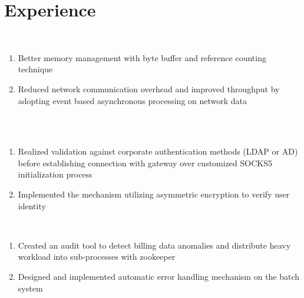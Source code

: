 \documentclass[]{deedy-resume-openfont}
\begin{document}
\section{Experience}
 \\
\begin{enumerate}[label=$\diamond$]
    \item Better memory management with byte buffer and reference counting technique
    \item Reduced network communication overhead and improved throughput by adopting event based asynchronous processing on network data
\end{enumerate}
 \\
\\
\begin{enumerate}[label=$\diamond$]
    \item Realized validation against corporate authentication methods (LDAP or AD) before establishing connection with gateway over customized SOCKS5 initialization process
    \item Implemented the mechanism utilizing asymmetric encryption to verify user identity 
\end{enumerate}
 \\
\begin{enumerate}[label=$\diamond$]
    \item Created an audit tool to detect billing data anomalies and distribute heavy workload into sub-processes with zookeeper
    \item Designed and implemented automatic error handling mechanism on the batch system
\end{enumerate}
\end{document}
